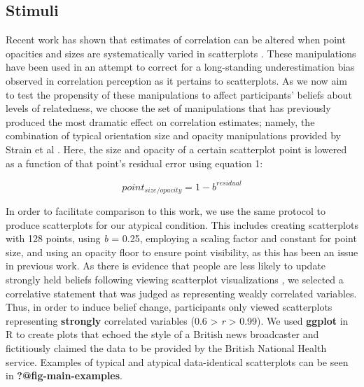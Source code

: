 \documentclass[manuscript,screen,review]{acmart}
\begin{document}
\subsection{Stimuli}\label{stimuli}

Recent work has shown that estimates of correlation can be altered when
point opacities and sizes are systematically varied in scatterplots
\citep{strain_2023, strain_2023b, strain_2024}. These manipulations have
been used in an attempt to correct for a long-standing underestimation
bias observed in correlation perception as it pertains to scatterplots.
As we now aim to test the propensity of these manipulations to affect
participants' beliefs about levels of relatedness, we choose the set of
manipulations that has previously produced the most dramatic effect on
correlation estimates; namely, the combination of typical orientation
size and opacity manipulations provided by Strain et al
\citep{strain_2024}. Here, the size and opacity of a certain scatterplot
point is lowered as a function of that point's residual error using
equation 1:

\begin{equation}
  point_{size/opacity} = 1 - b^{residual}
\end{equation}

In order to facilitate comparison to this work, we use the same protocol
to produce scatterplots for our atypical condition. This includes
creating scatterplots with 128 points, using \emph{b} = 0.25, employing
a scaling factor and constant for point size, and using an opacity floor
to ensure point visibility, as this has been an issue in previous work.
As there is evidence that people are less likely to update strongly held
beliefs following viewing scatterplot visualizations \citep[ look for
more]{markant_2023}, we selected a correlative statement that was judged
as representing weakly correlated variables. Thus, in order to induce
belief change, participants only viewed scatterplots representing
\textbf{strongly} correlated variables (0.6 \textgreater{} \emph{r}
\textgreater{} 0.99). We used \textbf{ggplot} in R to create plots that
echoed the style of a British news broadcaster and fictitiously claimed
the data to be provided by the British National Health service. Examples
of typical and atypical data-identical scatterplots can be seen in
\textbf{?@fig-main-examples}.
\end{document}
